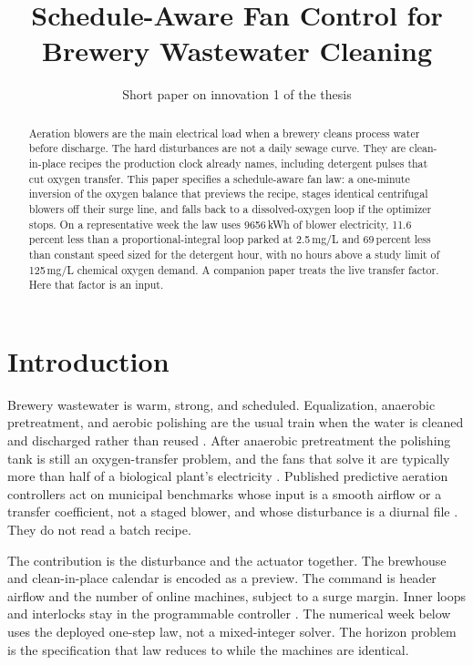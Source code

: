 \documentclass[11pt,a4paper]{article}
\title{Schedule-Aware Fan Control for\\Brewery Wastewater Cleaning}
\author{Short paper on innovation 1 of the thesis}
\date{}
\begin{document}
\maketitle
\thispagestyle{empty}

\begin{abstract}
\noindent
Aeration blowers are the main electrical load when a brewery cleans process water before discharge. The hard disturbances are not a daily sewage curve. They are clean-in-place recipes the production clock already names, including detergent pulses that cut oxygen transfer. This paper specifies a schedule-aware fan law: a one-minute inversion of the oxygen balance that previews the recipe, stages identical centrifugal blowers off their surge line, and falls back to a dissolved-oxygen loop if the optimizer stops. On a representative week the law uses 9656\,kWh of blower electricity, 11.6\,percent less than a proportional-integral loop parked at 2.5\,mg/L and 69\,percent less than constant speed sized for the detergent hour, with no hours above a study limit of 125\,mg/L chemical oxygen demand. A companion paper treats the live transfer factor. Here that factor is an input.
\end{abstract}

\section{Introduction}

Brewery wastewater is warm, strong, and scheduled. Equalization, anaerobic pretreatment, and aerobic polishing are the usual train when the water is cleaned and discharged rather than reused \cite{simate2011,fillaudeau2006,ashraf2021}. After anaerobic pretreatment the polishing tank is still an oxygen-transfer problem, and the fans that solve it are typically more than half of a biological plant's electricity \cite{longo2016,amand2013}. Published predictive aeration controllers act on municipal benchmarks whose input is a smooth airflow or a transfer coefficient, not a staged blower, and whose disturbance is a diurnal file \cite{holenda2008,shen2008,zeng2015,cristea2011}. They do not read a batch recipe.

The contribution is the disturbance and the actuator together. The brewhouse and clean-in-place calendar is encoded as a preview. The command is header airflow and the number of online machines, subject to a surge margin. Inner loops and interlocks stay in the programmable controller \cite{qin2003,obrien2011}. The numerical week below uses the deployed one-step law, not a mixed-integer solver. The horizon problem is the specification that law reduces to while the machines are identical.
\end{document}
